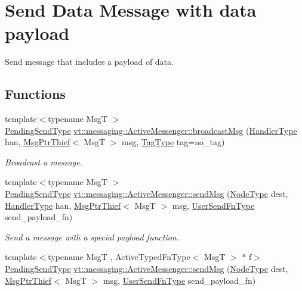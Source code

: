 \hypertarget{group__sendpayload}{}\section{Send Data Message with data payload}
\label{group__sendpayload}


Send message that includes a payload of data.  


\subsection*{Functions}
\begin{DoxyCompactItemize}
\item 
{\footnotesize template$<$typename MsgT $>$ }\\\hyperlink{structvt_1_1messaging_1_1_active_messenger_a3626a6ca76d8ad4ec7c3b47a2c70d3a8}{Pending\+Send\+Type} \hyperlink{group__sendpayload_ga8fd0c564e6c5d0bde3fbfa2e9a9d5ad9}{vt\+::messaging\+::\+Active\+Messenger\+::broadcast\+Msg} (\hyperlink{namespacevt_af64846b57dfcaf104da3ef6967917573}{Handler\+Type} han, \hyperlink{structvt_1_1messaging_1_1_msg_ptr_thief}{Msg\+Ptr\+Thief}$<$ MsgT $>$ msg, \hyperlink{namespacevt_a84ab281dae04a52a4b243d6bf62d0e52}{Tag\+Type} tag=no\+\_\+tag)
\begin{DoxyCompactList}\small\item\em Broadcast a message. \end{DoxyCompactList}\item 
{\footnotesize template$<$typename MsgT $>$ }\\\hyperlink{structvt_1_1messaging_1_1_active_messenger_a3626a6ca76d8ad4ec7c3b47a2c70d3a8}{Pending\+Send\+Type} \hyperlink{group__sendpayload_ga3548fb78b56bcd3f06cdb2fc6239e3c6}{vt\+::messaging\+::\+Active\+Messenger\+::send\+Msg} (\hyperlink{namespacevt_a866da9d0efc19c0a1ce79e9e492f47e2}{Node\+Type} dest, \hyperlink{namespacevt_af64846b57dfcaf104da3ef6967917573}{Handler\+Type} han, \hyperlink{structvt_1_1messaging_1_1_msg_ptr_thief}{Msg\+Ptr\+Thief}$<$ MsgT $>$ msg, \hyperlink{structvt_1_1messaging_1_1_active_messenger_a4b1993ad77436b6ed6c7fd32801c50ed}{User\+Send\+Fn\+Type} send\+\_\+payload\+\_\+fn)
\begin{DoxyCompactList}\small\item\em Send a message with a special payload function. \end{DoxyCompactList}\item 
{\footnotesize template$<$typename MsgT , Active\+Typed\+Fn\+Type$<$ Msg\+T $>$ $\ast$ f$>$ }\\\hyperlink{structvt_1_1messaging_1_1_active_messenger_a3626a6ca76d8ad4ec7c3b47a2c70d3a8}{Pending\+Send\+Type} \hyperlink{group__sendpayload_ga11c4c7dec9f0da88060bacff76fb118d}{vt\+::messaging\+::\+Active\+Messenger\+::send\+Msg} (\hyperlink{namespacevt_a866da9d0efc19c0a1ce79e9e492f47e2}{Node\+Type} dest, \hyperlink{structvt_1_1messaging_1_1_msg_ptr_thief}{Msg\+Ptr\+Thief}$<$ MsgT $>$ msg, \hyperlink{structvt_1_1messaging_1_1_active_messenger_a4b1993ad77436b6ed6c7fd32801c50ed}{User\+Send\+Fn\+Type} send\+\_\+payload\+\_\+fn)

\end{DoxyCompactItemize}

